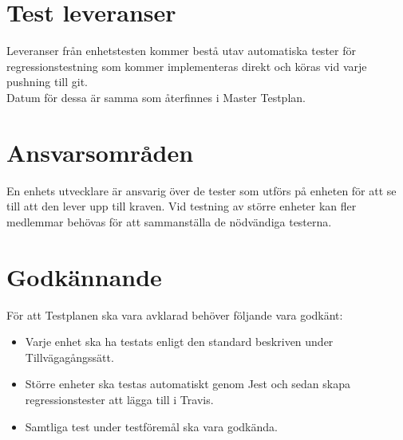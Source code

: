 \section{Test leveranser}

Leveranser från enhetstesten kommer bestå utav automatiska tester för regressionstestning som kommer implementeras direkt och köras vid varje pushning till git.\\

Datum för dessa är samma som återfinnes i Master Testplan.



\section{Ansvarsområden}
	En enhets utvecklare är ansvarig över de tester som utförs på enheten för att se till att den lever upp till kraven. Vid testning av större enheter kan fler medlemmar behövas för att sammanställa de nödvändiga testerna.



\section{Godkännande}
	För att Testplanen ska vara avklarad behöver följande vara godkänt:
	\begin{itemize}
	 \item Varje enhet ska ha testats enligt den standard beskriven under Tillvägagångssätt.
	 \item Större enheter ska testas automatiskt genom Jest och sedan skapa regressionstester att lägga till i Travis.
	 \item Samtliga test under testföremål ska vara godkända.
	\end{itemize}




\printbibliography


